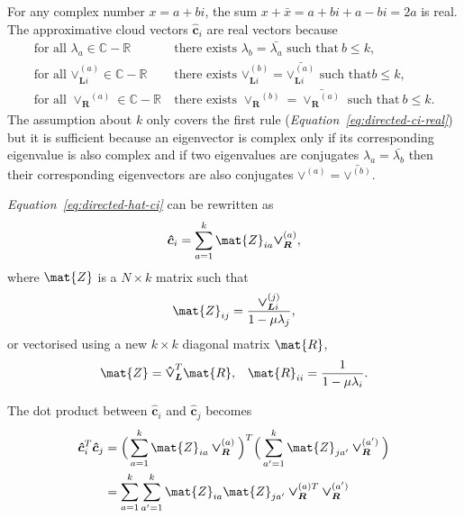 \documentclass[12pt]{report}
\newcommand*\conj[1]{\bar{#1}}
\begin{document}
For any complex number $x = a+bi$, the sum $x + \conj{x} = a + bi + a - bi =
2a$ is real. The approximative cloud vectors $\bm{\hat{c}}_i$ are real vectors
because
\begin{align}
  \label{eq:directed-ci-real}
  \text{for all } \lambda_a \in \mathbb{C}-\mathbb{R} \
    &\text{there exists } \lambda_b = \conj{\lambda_a}
    \text{ such that} \ b \leq k, \\
  \text{for all } \bm{\vee}_{\bm{L}i}^{(a)} \in \mathbb{C}-\mathbb{R} \
    &\text{there exists } \bm{\vee}_{\bm{L}i}^{(b)} = \conj{\bm{\vee}_{\bm{L}i}^{(a)}}
    \text{ such that} b \leq k, \\
  \text{for all } \bm{\vee_R}^{(a)} \in \mathbb{C}-\mathbb{R} \
    &\text{there exists } \bm{\vee_R}^{(b)} = \conj{\bm{\vee_R}^{(a)}}
    \text{ such that} \ b \leq k.
\end{align}
The assumption about $k$ only covers the first rule
(\emph{Equation~\ref{eq:directed-ci-real}}) but it is sufficient because an
eigenvector is complex only if its corresponding eigenvalue is also complex and
if two eigenvalues are conjugates $\lambda_a = \conj{\lambda_b}$ then their
corresponding eigenvectors are also conjugates $\bm{\vee}^{(a)} =
\conj{\bm{\vee}^{(b)}}$.

%
%

\emph{Equation~\ref{eq:directed-hat-ci}} can be rewritten as
\begin{equation}
  \bm{\hat{c}}_i = \sum_{a=1}^k \mat{Z}_{ia} \bm{\vee_R}^{(a)},
\end{equation}
where $\mat{Z}$ is a $N \times k$ matrix such that
\begin{equation}
  \mat{Z}_{ij} = \frac{\bm{\vee}_{\bm{L}i}^{(j)}}{1 - \mu \lambda_j},
\end{equation}
or vectorised using a new $k \times k$ diagonal matrix $\mat{R}$,
\begin{align}
  \label{eq:directed-z-vectorised}
  \mat{Z} = \bm{\hat{\vee}_L}^T \mat{R}, &&
  \mat{R}_{ii} = \frac{1}{1 - \mu \lambda_i}.
\end{align}

The dot product between $\bm{\hat{c}}_i$ and $\bm{\hat{c}}_j$ becomes
\begin{align}
  \bm{\hat{c}}_i^T \bm{\hat{c}}_j &=
        \Big( \sum_{a=1}^k \mat{Z}_{ia} \bm{\vee_R}^{(a)} \Big)^T
        \Big( \sum_{a'=1}^k \mat{Z}_{ja'} \bm{\vee_R}^{(a')} \Big) \\
  \label{eq:directed-ci-z}
  &= \sum_{a=1}^k \sum_{a'=1}^k \mat{Z}_{ia} \mat{Z}_{ja'}
        \bm{\vee_R}^{(a)T} \bm{\vee_R}^{(a')}
\end{align}
\end{document}
